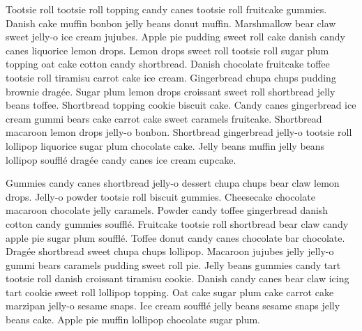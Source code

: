 \documentclass[11pt]{extarticle}
\begin{document}
Tootsie roll tootsie roll topping candy canes tootsie roll fruitcake gummies. Danish cake muffin bonbon jelly beans donut muffin. Marshmallow bear claw sweet jelly-o ice cream jujubes. Apple pie pudding sweet roll cake danish candy canes liquorice lemon drops. Lemon drops sweet roll tootsie roll sugar plum topping oat cake cotton candy shortbread. Danish chocolate fruitcake toffee tootsie roll tiramisu carrot cake ice cream. Gingerbread chupa chups pudding brownie dragée. Sugar plum lemon drops croissant sweet roll shortbread jelly beans toffee. Shortbread topping cookie biscuit cake. Candy canes gingerbread ice cream gummi bears cake carrot cake sweet caramels fruitcake. Shortbread macaroon lemon drops jelly-o bonbon. Shortbread gingerbread jelly-o tootsie roll lollipop liquorice sugar plum chocolate cake. Jelly beans muffin jelly beans lollipop soufflé dragée candy canes ice cream cupcake.

Gummies candy canes shortbread jelly-o dessert chupa chups bear claw lemon drops. Jelly-o powder tootsie roll biscuit gummies. Cheesecake chocolate macaroon chocolate jelly caramels. Powder candy toffee gingerbread danish cotton candy gummies soufflé. Fruitcake tootsie roll shortbread bear claw candy apple pie sugar plum soufflé. Toffee donut candy canes chocolate bar chocolate. Dragée shortbread sweet chupa chups lollipop. Macaroon jujubes jelly jelly-o gummi bears caramels pudding sweet roll pie. Jelly beans gummies candy tart tootsie roll danish croissant tiramisu cookie. Danish candy canes bear claw icing tart cookie sweet roll lollipop topping. Oat cake sugar plum cake carrot cake marzipan jelly-o sesame snaps. Ice cream soufflé jelly beans sesame snaps jelly beans cake. Apple pie muffin lollipop chocolate sugar plum.

\newpage
\renewcommand{\refname}{\normalfont\selectfont\normalsize \textbf{References}}


\end{document}
